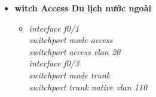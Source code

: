 \documentclass[a4paper, 12pt]{article}
\begin{document}
\begin{itemize}
\begin{itemize}
\begin{itemize}
    \end{itemize}
     \item \textbf{witch Access  Du lịch nước ngoài}
     \begin{itemize}
      \item \textit{interface f0/1\\
                    switchport mode access\\
                    switchport access vlan 20\\
                    interface f0/3\\
                    switchport mode trunk\\
                    switchport trunk native vlan 110\\}
     
    \end{itemize}
   \end{itemize}
\end{itemize}
\end{document}
